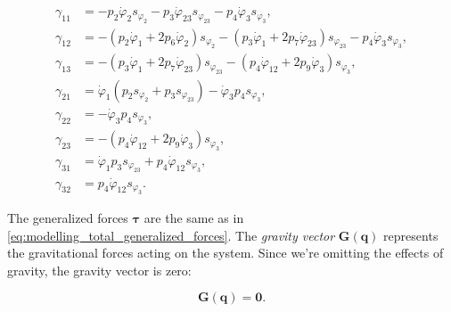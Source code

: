 \begin{align*}
    \gamma_{11}
    &=
    -p_2 \dot{\varphi}_2 s_{\varphi_2}
    -p_3 \dot{\varphi}_{23} s_{\varphi_{23}}
    -p_4 \dot{\varphi}_3 s_{\varphi_3},
    \\
    \gamma_{12}
    &=
    -\left(
        p_2 \dot{\varphi}_1
        + 2p_6 \dot{\varphi}_2
    \right)s_{\varphi_2}
    -
    \left(
        p_3 \dot{\varphi}_1
        + 2p_7 \dot{\varphi}_{23}
    \right)s_{\varphi_{23}}
    -p_4 \dot{\varphi}_3 s_{\varphi_3},
    \\
    \gamma_{13}
    &=
    -
    \left(
        p_3 \dot{\varphi}_1
        + 2p_7 \dot{\varphi}_{23}
    \right)s_{\varphi_{23}}
    -
    \left(
        p_4 \dot{\varphi}_{12}
        + 2p_9 \dot{\varphi}_3
    \right)s_{\varphi_3},
    \\
    \gamma_{21}
    &= \dot{\varphi}_1
    \left(p_2 s_{\varphi_2} + p_3 s_{\varphi_{23}}\right)
    - \dot{\varphi}_3 p_4 s_{\varphi_3},
    \\
    \gamma_{22}
    &= -\dot{\varphi}_3 p_4 s_{\varphi_3},
    \\
    \gamma_{23}
    &= -
    \left(
        p_4 \dot{\varphi}_{12}
        + 2p_9 \dot{\varphi}_3
    \right)
    s_{\varphi_3},
    \\
    \gamma_{31}
    &= \dot{\varphi}_1 p_3 s_{\varphi_{23}}
    + p_4 \dot{\varphi}_{12} s_{\varphi_3},
    \\
    \gamma_{32}
    &= p_4 \dot{\varphi}_{12} s_{\varphi_3}.
\end{align*}

 The generalized forces $\boldsymbol{\tau}$ are the same as in \cref{eq:modelling_total_generalized_forces}. The \textit{gravity vector} $\mathbf{G}(\mathbf{q})$ represents the gravitational forces acting on the system. Since we're omitting the effects of gravity, the gravity vector is zero:

\begin{equation}
    \label{eq:modelling_gravity_vector}
    \mathbf{G}(\mathbf{q}) = \mathbf{0}.
\end{equation}

